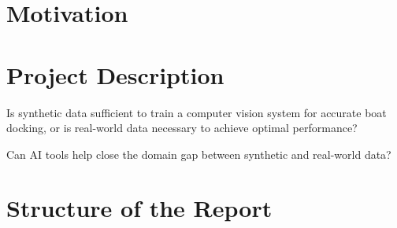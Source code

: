 


\section{Motivation}



\section{Project Description}


Is synthetic data sufficient to train a computer vision system for accurate boat docking, or is real-world data necessary to achieve optimal performance?

Can AI tools help close the domain gap between synthetic and real-world data?

\section{Structure of the Report}
